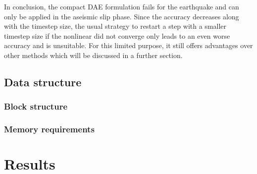 \begin{figure}[H]
\end{figure}

In conclusion, the compact DAE formulation fails for the earthquake and can only be applied in the aseismic slip phase. Since the accuracy decreases along with the timestep size, the usual strategy to restart a step with a smaller timestep size if the nonlinear did not converge only leads to an even worse accuracy and is unsuitable. For this limited purpose, it still offers advantages over other methods which will be discussed in a further section.

\subsection{Data structure}
\subsubsection{Block structure}
\subsubsection{Memory requirements}

\section{Results}
